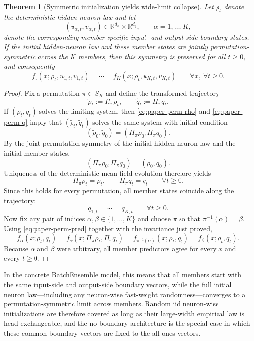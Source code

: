 \documentclass{article}
\newcommand{\R}{\mathbb{R}}
\newtheorem{theorem}{Theorem}
\begin{document}
\begin{theorem}[Symmetric initialization yields wide-limit collapse]
\label{thm:paper-collapse}
Let $\rho_t$ denote the deterministic hidden-neuron law and let
\[
(u_{\alpha,t},v_{\alpha,t})\in\R^{d_x}\times\R^{d_y},
\qquad
\alpha=1,\dots,K,
\]
denote the corresponding member-specific input- and output-side boundary states. If the initial hidden-neuron law and these member states are jointly permutation-symmetric across the $K$ members, then this symmetry is preserved for all $t\ge 0$, and consequently
\[
f_1(x;\rho_t,u_{1,t},v_{1,t})=\cdots=f_K(x;\rho_t,u_{K,t},v_{K,t})
\qquad
\forall x,\ \forall t\ge 0.
\]
\end{theorem}

\begin{proof}
Fix a permutation $\pi\in S_K$ and define the transformed trajectory
\[
\widetilde\rho_t:=\Pi_\pi\rho_t,
\qquad
\widetilde q_t:=\Pi_\pi q_t.
\]
If $(\rho_t,q_t)$ solves the limiting system, then \eqref{eq:paper-perm-rho} and \eqref{eq:paper-perm-q} imply that $(\widetilde\rho_t,\widetilde q_t)$ solves the same system with initial condition
\[
(\widetilde\rho_0,\widetilde q_0)
=
(\Pi_\pi\rho_0,\Pi_\pi q_0).
\]
By the joint permutation symmetry of the initial hidden-neuron law and the initial member states,
\[
(\Pi_\pi\rho_0,\Pi_\pi q_0)
=
(\rho_0,q_0).
\]
Uniqueness of the deterministic mean-field evolution therefore yields
\[
\Pi_\pi\rho_t=\rho_t,
\qquad
\Pi_\pi q_t=q_t
\qquad
\forall t\ge 0.
\]
Since this holds for every permutation, all member states coincide along the trajectory:
\[
q_{1,t}=\cdots=q_{K,t}
\qquad
\forall t\ge 0.
\]
Now fix any pair of indices $\alpha,\beta\in\{1,\dots,K\}$ and choose $\pi$ so that $\pi^{-1}(\alpha)=\beta$. Using \eqref{eq:paper-perm-pred} together with the invariance just proved,
\[
f_\alpha(x;\rho_t,q_t)
=
f_\alpha(x;\Pi_\pi\rho_t,\Pi_\pi q_t)
=
f_{\pi^{-1}(\alpha)}(x;\rho_t,q_t)
=
f_\beta(x;\rho_t,q_t).
\]
Because $\alpha$ and $\beta$ were arbitrary, all member predictors agree for every $x$ and every $t\ge 0$.
\end{proof}

In the concrete BatchEnsemble model, this means that all members start with the same input-side and output-side boundary vectors, while the full initial neuron law---including any neuron-wise fast-weight randomness---converges to a permutation-symmetric limit across members. Random iid neuron-wise initializations are therefore covered as long as their large-width empirical law is head-exchangeable, and the no-boundary architecture is the special case in which these common boundary vectors are fixed to the all-ones vectors.
\end{document}
